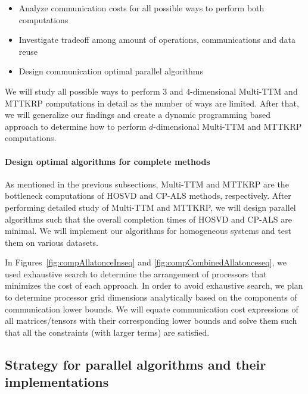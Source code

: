 \documentclass[a4paper,11pt]{article}
\begin{document}
	
	\begin{itemize}
		\item Analyze communication costs for all possible ways to perform both computations 
		\item Investigate tradeoff among amount of operations, communications and data reuse
		\item Design communication optimal parallel algorithms
	\end{itemize}
	
	
	We will study all possible ways to perform $3$ and $4$-dimensional Multi-TTM and MTTKRP computations in detail as the number of ways are limited. After that, we will generalize our findings and create a dynamic programming based approach to determine how to perform $d$-dimensional Multi-TTM and MTTKRP computations.
	
	\paragraph{Design optimal algorithms for complete methods}
	As mentioned in the previous subsections, Multi-TTM and MTTKRP are  the bottleneck computations of HOSVD and CP-ALS methods, respectively. After performing detailed study of Multi-TTM and MTTKRP, we will design parallel algorithms such that the overall completion times of HOSVD and CP-ALS are minimal. We will implement our algorithms for homogeneous systems and test them on various datasets. 
	
	In Figures~\ref{fig:compAllatonceInseq} and \ref{fig:compCombinedAllatonceseq}, we used exhaustive search to determine the arrangement of processors that minimizes the cost of each approach. In order to avoid exhaustive search, we plan to determine processor grid dimensions analytically based on the components of communication lower bounds. We will equate communication cost expressions of all matrices/tensors with their corresponding lower bounds and solve them such that all the constraints (with larger terms) are satisfied.
	

	
	
	\subsection{Strategy for parallel algorithms and their implementations}
	
\end{document}
